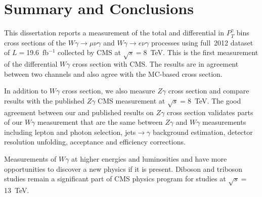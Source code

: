 \chapter{Summary and Conclusions}
\label{sec:Conclusions}

This dissertation reports a measurement of the total and differential in $P_T^{\gamma}$ bins cross sections of the $W\gamma\rightarrow\mu\nu\gamma$ and $W\gamma\rightarrow e\nu\gamma$ processes using full~2012 dataset of $L=$19.6~fb$^{-1}$ collected by CMS at $\sqrt{s}=$8~TeV. This is the first measurement of the differential $W\gamma$ cross section with CMS. The results are in agreement between two channels and also agree with the MC-based cross section.

In addition to $W\gamma$ cross section, we also measure $Z\gamma$ cross section and compare results with the published $Z\gamma$ CMS measurement at $\sqrt{s}=$8~TeV. The good agreement between our and published results on $Z\gamma$ cross section validates parts of our $W\gamma$ measurement that are the same between $Z\gamma$ and $W\gamma$ measurements including lepton and photon selection, jets$\rightarrow\gamma$ background estimation, detector resolution unfolding, acceptance and efficiency corrections.

Measurements of $W\gamma$ at higher energies and luminosities and have more opportunities to discover a new physics if it is present. Diboson and triboson studies remain a significant part of CMS physics program for studies at $\sqrt{s}=$13~TeV.

